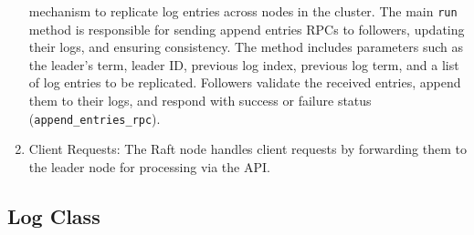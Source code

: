 \documentclass{article}
\begin{document}
\begin{enumerate}
    mechanism to replicate log entries across nodes in the cluster. The main \texttt{run} 
    method is responsible for sending append entries RPCs to followers, updating their logs, 
    and ensuring consistency. The method includes parameters such as the leader's term, leader 
    ID, previous log index, previous log term, and a list of log entries to be replicated. 
    Followers validate the received entries, append them to their logs, and respond with 
    success or failure status (\texttt{append\_entries\_rpc}).
    \item Client Requests: The Raft node handles client requests by forwarding them to the 
    leader node for processing via the API.
\end{enumerate}

\subsection{Log Class}
\end{document}
